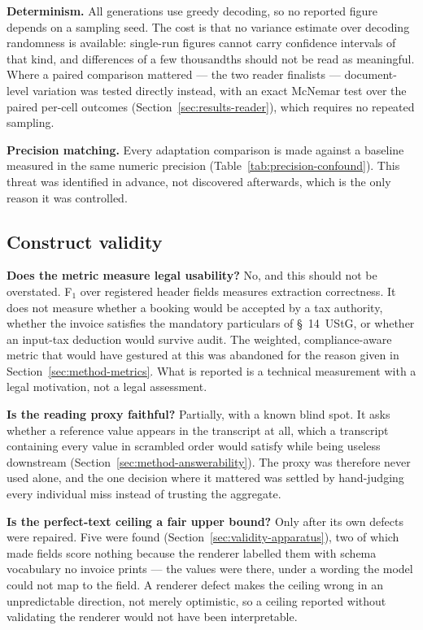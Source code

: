 \textbf{Determinism.} All generations use greedy decoding, so no reported figure depends on a
sampling seed. The cost is that no variance estimate over decoding randomness is available:
single-run figures cannot carry confidence intervals of that kind, and differences of a few
thousandths should not be read as meaningful. Where a paired comparison mattered --- the two
reader finalists --- document-level variation was tested directly instead, with an exact
McNemar test over the paired per-cell outcomes (Section~\ref{sec:results-reader}), which requires
no repeated sampling.

\textbf{Precision matching.} Every adaptation comparison is made against a baseline measured in
the same numeric precision (Table~\ref{tab:precision-confound}). This threat was identified in
advance, not discovered afterwards, which is the only reason it was controlled.

\subsection{Construct validity}

\textbf{Does the metric measure legal usability?} No, and this should not be overstated. F$_1$
over registered header fields measures extraction correctness. It does not measure whether a
booking would be accepted by a tax authority, whether the invoice satisfies the mandatory
particulars of \S~14~\ac{UStG}, or whether an input-tax deduction would survive audit. The
weighted, compliance-aware metric that would have gestured at this was abandoned for the reason
given in Section~\ref{sec:method-metrics}. What is reported is a technical measurement with a legal
motivation, not a legal assessment.

\textbf{Is the reading proxy faithful?} Partially, with a known blind spot. It asks whether a
reference value appears in the transcript at all, which a transcript containing every value in
scrambled order would satisfy while being useless downstream
(Section~\ref{sec:method-answerability}). The proxy was therefore never used alone, and the one
decision where it mattered was settled by hand-judging every individual miss instead of
trusting the aggregate.

\textbf{Is the perfect-text ceiling a fair upper bound?} Only after its own defects were
repaired. Five were found (Section~\ref{sec:validity-apparatus}), two of which made fields score
nothing because the renderer labelled them with schema vocabulary no invoice prints --- the
values were there, under a wording the model could not map to the field. A renderer defect makes
the ceiling wrong in an unpredictable direction, not merely optimistic, so a ceiling reported
without validating the renderer would not have been interpretable.

